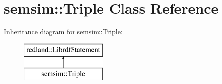 \hypertarget{classsemsim_1_1Triple}{}\section{semsim\+:\+:Triple Class Reference}
\label{classsemsim_1_1Triple}
Inheritance diagram for semsim\+:\+:Triple\+:\begin{figure}[H]
\begin{center}
\leavevmode
\includegraphics[height=2.000000cm]{classsemsim_1_1Triple}
\end{center}
\end{figure}
